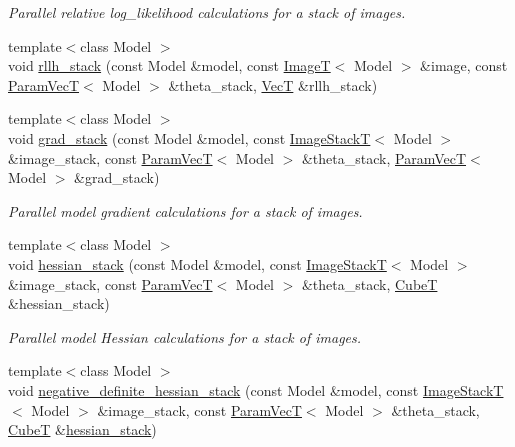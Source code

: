 \begin{DoxyCompactItemize}
\begin{DoxyCompactList}\small\item\em Parallel relative log\+\_\+likelihood calculations for a stack of images. \end{DoxyCompactList}\item 
{\footnotesize template$<$class Model $>$ }\\void \hyperlink{namespacemappel_1_1methods_1_1objective_1_1openmp_afc8658d8593725d7de99dc533fa74274}{rllh\+\_\+stack} (const Model \&model, const \hyperlink{namespacemappel_a14658186b77757f3c35a69cb1be6cf4b}{ImageT}$<$ Model $>$ \&image, const \hyperlink{namespacemappel_a0f86d3153e4e27b095012f140eea58de}{Param\+VecT}$<$ Model $>$ \&theta\+\_\+stack, \hyperlink{namespacemappel_a2225ad69f358daa3f4f99282a35b9a3a}{VecT} \&rllh\+\_\+stack)
\item 
{\footnotesize template$<$class Model $>$ }\\void \hyperlink{namespacemappel_1_1methods_1_1objective_1_1openmp_aab0aa1ca7dbd172a955148063a112f50}{grad\+\_\+stack} (const Model \&model, const \hyperlink{namespacemappel_a636dbe5b195c267a5f6a65cd48ff94a6}{Image\+StackT}$<$ Model $>$ \&image\+\_\+stack, const \hyperlink{namespacemappel_a0f86d3153e4e27b095012f140eea58de}{Param\+VecT}$<$ Model $>$ \&theta\+\_\+stack, \hyperlink{namespacemappel_a0f86d3153e4e27b095012f140eea58de}{Param\+VecT}$<$ Model $>$ \&grad\+\_\+stack)
\begin{DoxyCompactList}\small\item\em Parallel model gradient calculations for a stack of images. \end{DoxyCompactList}\item 
{\footnotesize template$<$class Model $>$ }\\void \hyperlink{namespacemappel_1_1methods_1_1objective_1_1openmp_a134e673cbfdb9ac4e2d9ebec23ca2841}{hessian\+\_\+stack} (const Model \&model, const \hyperlink{namespacemappel_a636dbe5b195c267a5f6a65cd48ff94a6}{Image\+StackT}$<$ Model $>$ \&image\+\_\+stack, const \hyperlink{namespacemappel_a0f86d3153e4e27b095012f140eea58de}{Param\+VecT}$<$ Model $>$ \&theta\+\_\+stack, \hyperlink{namespacemappel_ab2afab4e6c8805e83946670d882768c2}{CubeT} \&hessian\+\_\+stack)
\begin{DoxyCompactList}\small\item\em Parallel model Hessian calculations for a stack of images. \end{DoxyCompactList}\item 
{\footnotesize template$<$class Model $>$ }\\void \hyperlink{namespacemappel_1_1methods_1_1objective_1_1openmp_ad6a735087d0a6a785be32c3edaff6f1e}{negative\+\_\+definite\+\_\+hessian\+\_\+stack} (const Model \&model, const \hyperlink{namespacemappel_a636dbe5b195c267a5f6a65cd48ff94a6}{Image\+StackT}$<$ Model $>$ \&image\+\_\+stack, const \hyperlink{namespacemappel_a0f86d3153e4e27b095012f140eea58de}{Param\+VecT}$<$ Model $>$ \&theta\+\_\+stack, \hyperlink{namespacemappel_ab2afab4e6c8805e83946670d882768c2}{CubeT} \&\hyperlink{namespacemappel_1_1methods_1_1objective_1_1openmp_a134e673cbfdb9ac4e2d9ebec23ca2841}{hessian\+\_\+stack})

\end{DoxyCompactItemize}
